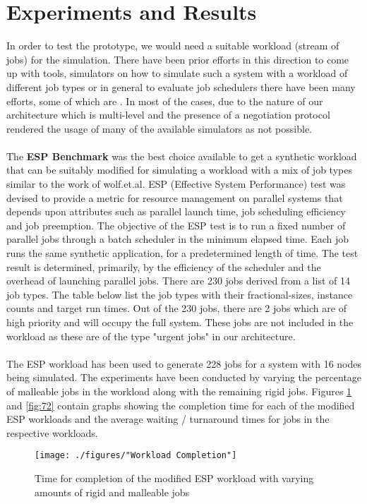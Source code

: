 \section{Experiments and Results}
In order to test the prototype, we would need a suitable workload (stream of jobs) for the simulation. There have been prior efforts in this direction to come up with tools, simulators on how to simulate such a system with a workload of different job types\cite{yangjie} or in general to evaluate job schedulers there have been many efforts, some of which are \cite{lucero}\cite{dalibor}. In most of the cases, due to the nature of our architecture which is multi-level and the presence of a negotiation protocol rendered the usage of many of the available simulators as not possible.\\ \\
The \textbf{ESP Benchmark}\cite{wong} was the best choice available to get a synthetic workload that can be suitably modified for simulating a workload with a mix of job types similar to the work of wolf.et.al\cite{laxmikant}. ESP (Effective System Performance) test was devised to provide a metric for resource management on parallel systems that depends upon attributes such as parallel launch time, job scheduling efficiency and job preemption. The objective of the ESP test is to run a fixed number of parallel jobs through a batch scheduler in the minimum elapsed time. Each job  runs the same synthetic application, for a predetermined length of time. The test result is determined, primarily, by the efficiency of the scheduler and the overhead of launching parallel jobs. There are 230 jobs derived from a list of 14 job types. The table below list the job types with their fractional-sizes, instance counts and target run times. Out of the 230 jobs, there are 2 jobs which are of high priority and will occupy the full system. These jobs are not included in the workload as these are of the type "urgent jobs" in our architecture.\\ \\
The ESP workload has been used to generate 228 jobs for a system with 16 nodes being simulated. The experiments have been conducted by varying the percentage of malleable jobs in the workload along with the remaining rigid jobs. Figures \ref{fig:71} and \ref{fig:72} contain graphs showing the completion time for each of the modified ESP workloads and the average waiting / turnaround times for jobs in the respective workloads.
\begin{figure}[!t]
\centering
\hspace*{-0.75in}
\texttt{[image: ./figures/"Workload Completion"]}
\caption{Time for completion of the modified ESP workload with varying amounts of rigid and malleable jobs}
\label{fig:71}
\end{figure}
